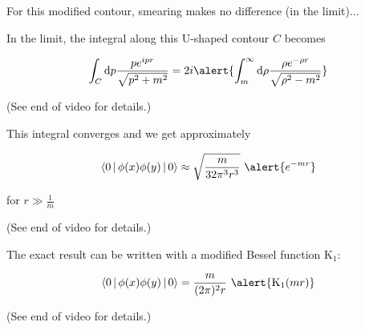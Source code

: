 \documentclass[aspectratio=169]{beamer}
\newcommand{\integrand}{\frac{p e^{ipr}}{\sqrt{p^2 + m^2}}}
\newcommand{\diffop}{\mathop{}\!\mathrm{d}}
\newcommand{\dip}{\diffop p}
\newcommand{\drho}{\diffop \rho}
\newcommand{\phixy}{\Braket{0|\phi(x)\phi(y)|0}}
\newcommand{\cintegral}{\int_m^\infty \drho \frac{\rho e^{-\rho r}}{\sqrt{\rho^2 - m^2}}}
\begin{document}
\begin{frame}
For this modified contour, smearing makes no difference (in the limit)...
\end{frame}




\begin{frame}
In the limit, the integral along this \alert{U}-shaped contour $C$ becomes

\pause
\begin{equation*}
\int_C \dip \integrand = 2i \alert{\cintegral}
\end{equation*}

\medskip
(See end of video for details.)
\end{frame}


\begin{frame}
This integral \alert{converges} and we get \alert{approximately}

\pause
\begin{equation*}
\phixy \approx \sqrt{\frac{m}{32\pi^3 r^3}} \ \alert{e^{-mr}}
\end{equation*}

\medskip
for $r \gg \frac{1}{m}$

\medskip
(See end of video for details.)
\end{frame}


\begin{frame}
The \alert{exact} result can be written with a \alert{modified Bessel function} $\mathrm{K}_1$:

\pause
\begin{equation*}
\phixy = \frac{m}{(2\pi)^2 r} \  \alert{\mathrm{K}_1(mr)}
\end{equation*}

\medskip
(See end of video for details.)
\end{frame}
\end{document}

